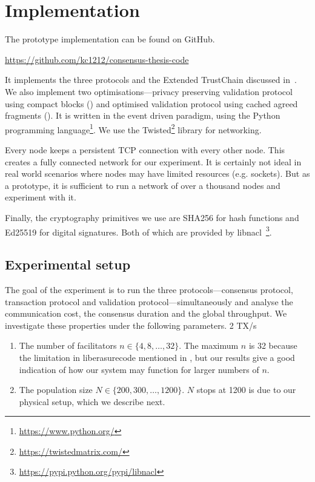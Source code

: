 \section{Implementation}
\label{sec:implementation}

The prototype implementation can be found on GitHub.
\begin{displayquote}
\url{https://github.com/kc1212/consensus-thesis-code}
\end{displayquote}
It implements the three protocols and the Extended TrustChain discussed in~.
We also implement two optimisations---privacy preserving validation protocol using compact blocks ()
and optimised validation protocol using cached agreed fragments ().
It is written in the event driven paradigm, using the Python programming language\footnote{\url{https://www.python.org/}}.
We use the Twisted\footnote{\url{https://twistedmatrix.com/}} library for networking.

Every node keeps a persistent TCP connection with every other node.
This creates a fully connected network for our experiment.
It is certainly not ideal in real world scenarios where nodes may have limited resources (e.g. sockets).
But as a prototype, it is sufficient to run a network of over a thousand nodes and experiment with it.

Finally, the cryptography primitives we use are SHA256 for hash functions and Ed25519 for digital signatures.
Both of which are provided by libnacl~\footnote{\url{https://pypi.python.org/pypi/libnacl}}.


\subsection{Experimental setup}
\label{sec:experimental-setup}

The goal of the experiment is to run the three protocols---consensus protocol,
transaction protocol and validation protocol---simultaneously and analyse the communication cost, the consensus duration and the global throughput.
We investigate these properties under the following parameters.
2 TX/s
\begin{enumerate}
  \item The number of facilitators $n \in \{4, 8, \dots, 32\}$.
        The maximum $n$ is 32 because the limitation in liberasurecode mentioned in ,
        but our results give a good indication of how our system may function for larger numbers of $n$.
  \item The population size $N \in \{200, 300, \dots, 1200\}$.
        $N$ stops at 1200 is due to our physical setup, which we describe next.
\end{enumerate}

